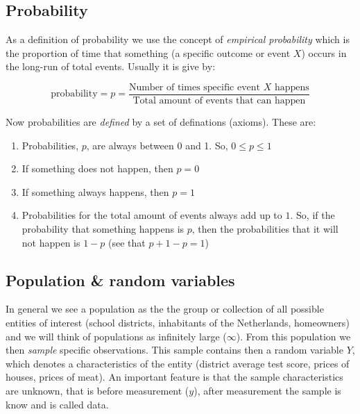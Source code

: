\documentclass[
]{book}
\providecommand{\tightlist}{%
  \setlength{\itemsep}{0pt}\setlength{\parskip}{0pt}}
\begin{document}
\hypertarget{probability}{%
\subsection{Probability}\label{probability}}

As a definition of probability we use the concept of \emph{empirical probability} which is the proportion of time that something (a specific outcome or event \(X\)) occurs in the long-run of total events. Usually it is give by:

\begin{equation}
 \text{probability} = p = \frac{\text{Number of times specific event $X$ happens}}{\text{Total amount of events that can happen}}
\end{equation}

Now probabilities are \emph{defined} by a set of definations (axioms). These are:

\begin{enumerate}
\def\labelenumi{\arabic{enumi})}
\tightlist
\item
  Probabilities, \(p\), are always between 0 and 1. So, \(0 \leq p \leq 1\)
\item
  If something does not happen, then \(p = 0\)
\item
  If something always happens, then \(p = 1\)
\item
  Probabilities for the total amount of events always add up to \(1\). So, if the probability that something happens is \(p\), then the probabilities that it will not happen is \(1 -p\) (see that \(p + 1 - p = 1\))
\end{enumerate}

\hypertarget{population-random-variables}{%
\subsection{Population \& random variables}\label{population-random-variables}}

In general we see a population as the the group or collection of all possible entities of interest (school districts, inhabitants of the Netherlands, homeowners) and we will think of populations as infinitely large (\(\infty\)). From this population we then \emph{sample} specific observations. This sample contains then a random variable \(Y\), which denotes a characteristics of the entity (district average test score, prices of houses, prices of meat). An important feature is that the sample characteristics are unknown, that is before measurement (\(y\)), after measurement the sample is know and is called data.
\end{document}
